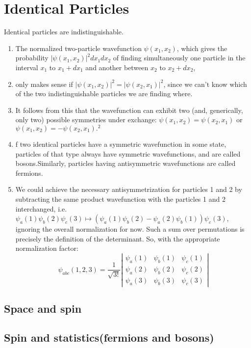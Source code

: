 \documentclass[12pt,a4paper]{article}
\begin{document}
\section{Identical Particles}
Identical particles are indistinguishable.
\begin{enumerate}
    \item The normalized two-particle wavefunction $\psi\left(x_1, x_2\right)$, which gives the probability $\left|\psi\left(x_1, x_2\right)\right|^2 d x_1 d x_2$ of finding simultaneously one particle in the interval $x_1$ to $x_1+d x_1$ and another between $x_2$ to $x_2+d x_2$,
    \item only makes sense if $\left|\psi\left(x_1, x_2\right)\right|^2=\left|\psi\left(x_2, x_1\right)\right|^2$, since we can't know which of the two indistinguishable particles we are finding where.
    \item It follows from this that the wavefunction can exhibit two (and, generically, only two) possible symmetries under exchange: $\psi\left(x_1, x_2\right)=\psi\left(x_2, x_1\right)$ or $\psi\left(x_1, x_2\right)=-\psi\left(x_2, x_1\right) .^2$ 
    \item f two identical particles have a symmetric wavefunction in some state, particles of that type always have symmetric wavefunctions, and are called bosons.Similarly, particles having antisymmetric wavefunctions are called fermions. 
    \item We could achieve the necessary antisymmetrization for particles 1 and 2 by subtracting the same product wavefunction with the particles 1 and 2 interchanged, i.e. $\psi_a(1) \psi_b(2) \psi_c(3) \mapsto\left(\psi_a(1) \psi_b(2)-\psi_a(2) \psi_b(1)\right) \psi_c(3)$, ignoring the overall normalization for now. Such a sum over permutations is precisely the definition of the determinant. So, with the appropriate normalization factor:
    $$
    \psi_{a b c}(1,2,3)=\frac{1}{\sqrt{3 !}}\left|\begin{array}{lll}
    \psi_a(1) & \psi_b(1) & \psi_c(1) \\
    \psi_a(2) & \psi_b(2) & \psi_c(2) \\
    \psi_a(3) & \psi_b(3) & \psi_c(3)
    \end{array}\right|
    $$
\end{enumerate}
\subsection{Space and spin}
\subsection{Spin and statistics(fermions and bosons)}
\end{document}
